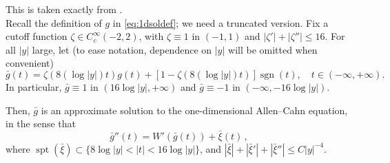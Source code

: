 \documentclass{article}
\theoremstyle{definition}
\begin{document}

This is taken exactly from \cite{GuiWangWei2020}.\\
Recall the definition of $g$ in \eqref{eq:1dsoldef}; we need a truncated version. Fix a cutoff function $\zeta \in C_c^\infty(-2,2)$, with $\zeta \equiv 1$ in $(-1,1)$ and $|\zeta'| + |\zeta''| \leq 16$.  For all $|y|$ large, let (to ease notation, dependence on $|y|$ will be omitted when convenient)
$$
\bar{g}(t) = \zeta(8 (\log |y|) t) g(t) + [1 - \zeta(8 (\log |y|) t)] \operatorname{sgn}(t), \quad t \in (-\infty, +\infty).
$$
In particular, $\bar{g} \equiv 1$ in $(16 \log |y|, +\infty)$ and $\bar{g} \equiv -1$ in $(-\infty, -16 \log |y|)$.

Then, $\bar{g}$ is an approximate solution to the one-dimensional Allen–Cahn equation, in the sense that
\begin{equation*}
\bar{g}''(t) = W'(\bar{g}(t)) + \bar{\xi}(t)\,,
\end{equation*}
where $\operatorname{spt}(\bar{\xi}) \subset \{8 \log |y| < |t| < 16 \log |y|\}$, and $|\bar{\xi}| + |\bar{\xi}'| + |\bar{\xi}''| \leq C|y|^{-4}$. 
\end{document}
